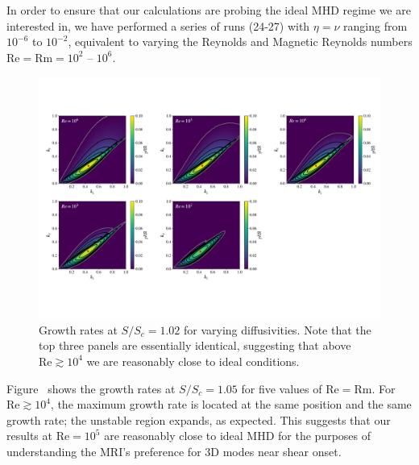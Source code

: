 \documentclass[openacc]{rsproca_new}%
\newcommand{\SSC}{S/S_{c}}
\newcommand{\Reyn}{\mathrm{Re}}
\newcommand{\Reym}{\mathrm{Rm}}
\begin{document}
In order to ensure that our calculations are probing the ideal MHD regime we are interested in, we have performed a series of runs (24-27) with $\eta = \nu$ ranging from $10^{-6}$ to $10^{-2}$, equivalent to varying the Reynolds and Magnetic Reynolds numbers $\Reyn = \Reym = 10^2$ -- $10^6$.
\begin{figure}[h!]
  \centering
  \includegraphics[width=\textwidth]{re_plots.pdf}
  \caption{Growth rates at $\SSC = 1.02$ for varying diffusivities. Note that the top three panels are essentially identical, suggesting that above $\Reyn \gtrsim 10^4$ we are reasonably close to ideal conditions.}
  \label{fig:reynolds}
\end{figure}
Figure~\pageref{fig:reynolds} shows the growth rates at $\SSC=1.05$ for five values of $\Reyn = \Reym$.
For $\Reyn \gtrsim 10^4$, the maximum growth rate is located at the same position and the same growth rate; the unstable region expands, as expected.
This suggests that our results at $\Reyn = 10^5$ are reasonably close to ideal MHD for the purposes of understanding the MRI's preference for 3D modes near shear onset.
\end{document}
